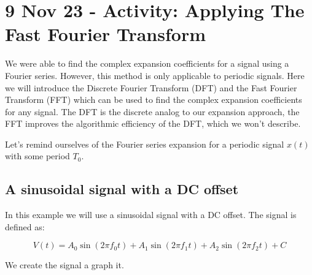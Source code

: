 \section{9 Nov 23 - Activity: Applying The Fast Fourier
Transform}\label{nov-23---activity-applying-the-fast-fourier-transform}

We were able to find the complex expansion coefficients for a signal
using a Fourier series. However, this method is only applicable to
periodic signals. Here we will introduce the Discrete Fourier Transform
(DFT) and the Fast Fourier Transform (FFT) which can be used to find the
complex expansion coefficients for any signal. The DFT is the discrete
analog to our expansion approach, the FFT improves the algorithmic
efficiency of the DFT, which we won't describe.

Let's remind ourselves of the Fourier series expansion for a periodic
signal \(x(t)\) with some period \(T_0\).

\begin{Shaded}
\begin{Highlighting}[]
\end{Highlighting}
\end{Shaded}

\subsection{A sinusoidal signal with a DC
offset}\label{a-sinusoidal-signal-with-a-dc-offset}

In this example we will use a sinusoidal signal with a DC offset. The
signal is defined as:

\[V(t) = A_0 \sin(2\pi f_0 t) + A_1 \sin(2\pi f_1 t) + A_2 \sin(2\pi f_2 t) + C\]

We create the signal a graph it.

